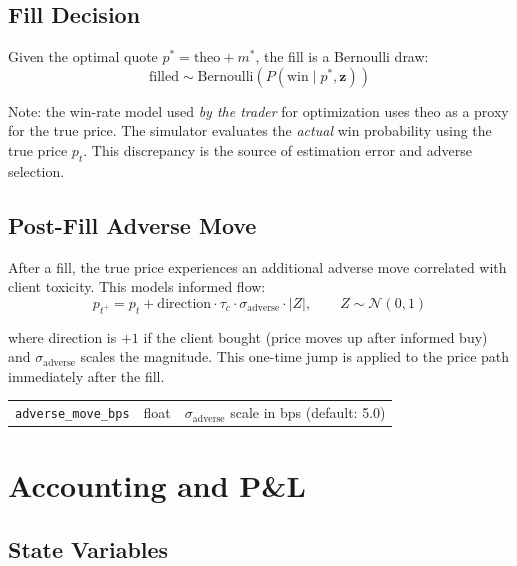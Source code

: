 \documentclass[11pt,a4paper]{article}
\begin{document}
\subsection{Fill Decision}

Given the optimal quote $p^* = \text{theo} + m^*$, the fill is a Bernoulli draw:
\begin{equation}
\text{filled} \sim \text{Bernoulli}\!\left(P(\text{win} \mid p^*, \mathbf{z})\right)
\end{equation}

Note: the win-rate model used \emph{by the trader} for optimization uses theo as a proxy for the true price. The simulator evaluates the \emph{actual} win probability using the true price $p_t$. This discrepancy is the source of estimation error and adverse selection.

\subsection{Post-Fill Adverse Move}

After a fill, the true price experiences an additional adverse move correlated with client toxicity. This models informed flow:
\begin{equation}
p_{t^+} = p_t + \text{direction} \cdot \tau_c \cdot \sigma_{\text{adverse}} \cdot |Z|, \qquad Z \sim \mathcal{N}(0,1)
\end{equation}

where direction is $+1$ if the client bought (price moves up after informed buy) and $\sigma_{\text{adverse}}$ scales the magnitude. This one-time jump is applied to the price path immediately after the fill.

\begin{parambox}[Knobs]
\begin{tabular}{@{}lll@{}}
\texttt{adverse\_move\_bps} & float & $\sigma_{\text{adverse}}$ scale in bps (default: 5.0) \\
\end{tabular}
\end{parambox}


\section{Accounting and P\&L}\label{sec:accounting}

\subsection{State Variables}
\end{document}
